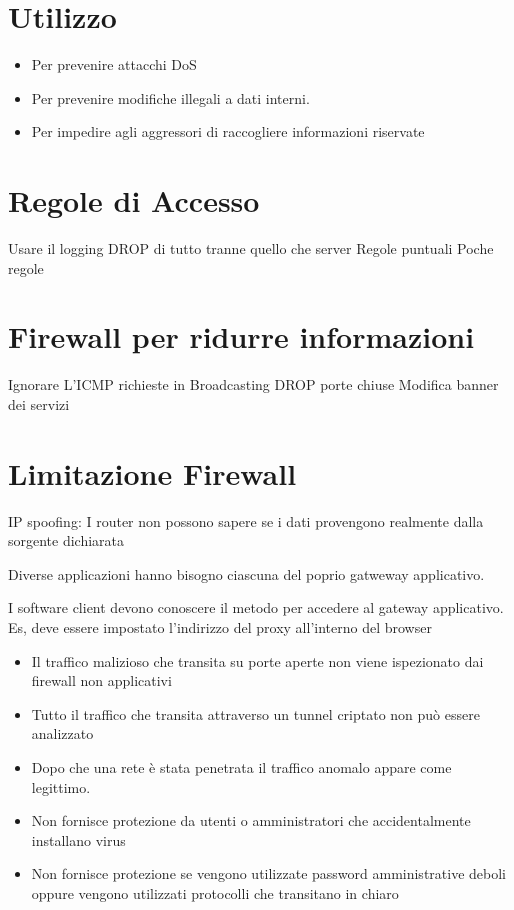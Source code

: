 \section{Utilizzo}
\begin{itemize}
    \item Per prevenire attacchi DoS
    \item Per prevenire modifiche illegali a dati interni.
    \item Per impedire agli aggressori di raccogliere informazioni riservate
\end{itemize}




\section{Regole di Accesso}
Usare il logging
DROP di tutto tranne quello che server
Regole puntuali
Poche regole 
\section{ Firewall per ridurre informazioni}
Ignorare
L'ICMP
richieste in Broadcasting
DROP porte chiuse
Modifica banner dei servizi




 
 \section{Limitazione Firewall}
 
 IP spoofing: I router non possono sapere se i dati provengono realmente dalla sorgente dichiarata

Diverse applicazioni hanno bisogno ciascuna del poprio gatweway applicativo.

I software client devono conoscere il metodo per accedere al gateway applicativo.
Es, deve essere impostato l’indirizzo del proxy all’interno del browser

\begin{itemize}
    \item Il traffico malizioso che transita su porte aperte non viene ispezionato dai firewall non applicativi

     \item Tutto il traffico che transita attraverso un tunnel criptato non può essere analizzato

    \item Dopo che una rete è stata penetrata il traffico anomalo appare come legittimo.

     \item Non fornisce protezione da utenti o amministratori che accidentalmente installano virus

   \item Non fornisce protezione se vengono utilizzate password amministrative deboli oppure vengono utilizzati protocolli che transitano in chiaro
   
   
\end{itemize}


